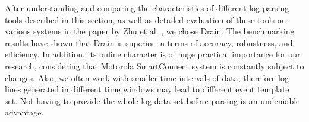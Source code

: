     After understanding and comparing the characteristics of different log parsing tools described in this section, as well as detailed evaluation of these tools on various systems in the paper by Zhu et al. \cite{zhlhxzl2018}, we chose Drain. The benchmarking results have shown that Drain is superior in terms of accuracy, robustness, and efficiency. In addition, its online character is of huge practical importance for our research, considering that Motorola SmartConnect system is constantly subject to changes. Also, we often work with smaller time intervals of data, therefore log lines generated in different time windows may lead to different event template set. Not having to provide the whole log data set before parsing is an undeniable advantage.
